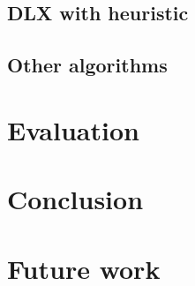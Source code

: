 \subsection{DLX with heuristic}

\subsection{Other algorithms}

\section{Evaluation}

\section{Conclusion}

\section{Future work}


{}




